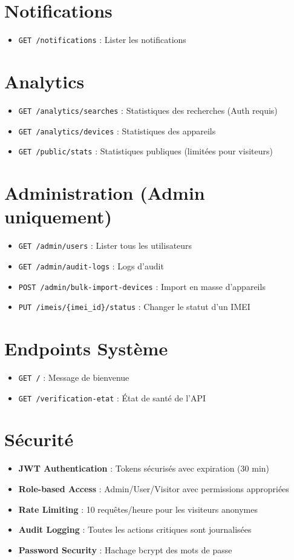 \documentclass{article}
\begin{document}
\section{Notifications}
\begin{itemize}
    \item \texttt{GET /notifications} : Lister les notifications
\end{itemize}

\section{Analytics}
\begin{itemize}
    \item \texttt{GET /analytics/searches} : Statistiques des recherches (Auth requis)
    \item \texttt{GET /analytics/devices} : Statistiques des appareils
    \item \texttt{GET /public/stats} : Statistiques publiques (limitées pour visiteurs)
\end{itemize}

\section{Administration (Admin uniquement)}
\begin{itemize}
    \item \texttt{GET /admin/users} : Lister tous les utilisateurs
    \item \texttt{GET /admin/audit-logs} : Logs d'audit
    \item \texttt{POST /admin/bulk-import-devices} : Import en masse d'appareils
    \item \texttt{PUT /imeis/\{imei\_id\}/status} : Changer le statut d'un IMEI
\end{itemize}

\section{Endpoints Système}
\begin{itemize}
    \item \texttt{GET /} : Message de bienvenue
    \item \texttt{GET /verification-etat} : État de santé de l'API
\end{itemize}

\section{Sécurité}
\begin{itemize}
    \item \textbf{JWT Authentication} : Tokens sécurisés avec expiration (30 min)
    \item \textbf{Role-based Access} : Admin/User/Visitor avec permissions appropriées
    \item \textbf{Rate Limiting} : 10 requêtes/heure pour les visiteurs anonymes
    \item \textbf{Audit Logging} : Toutes les actions critiques sont journalisées
    \item \textbf{Password Security} : Hachage bcrypt des mots de passe
\end{itemize}
\end{document}
